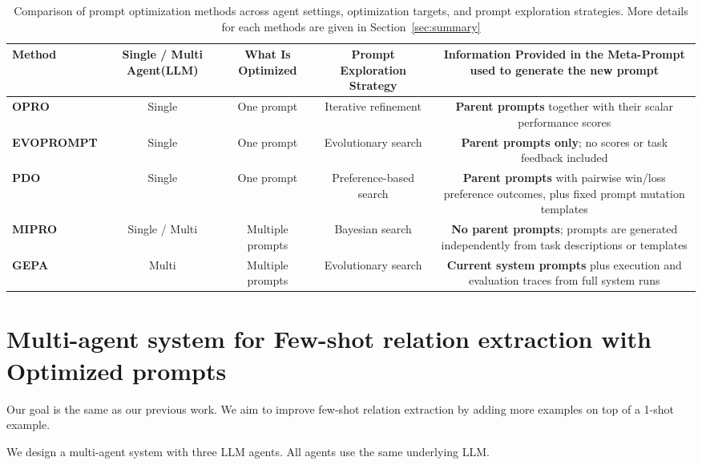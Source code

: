 \documentclass[12pt]{article}
\begin{document}
\pagebreak
\begin{table}[h]
\centering
\small
\begin{tabular}{l c c c c}
\toprule
\textbf{Method} &
\textbf{Single / Multi Agent(LLM)} &
\textbf{What Is Optimized} &
\textbf{Prompt Exploration Strategy} &
\textbf{Information Provided in the Meta-Prompt used to generate the new prompt} \\
\midrule

\textbf{OPRO} \cite{OPRA}&
Single &
One prompt &
Iterative refinement &
\textbf{Parent prompts} together with their scalar performance scores \\

\textbf{EVOPROMPT} \cite{EVOPROMPT} &
Single &
One prompt &
Evolutionary search &
\textbf{Parent prompts only}; no scores or task feedback included \\

\textbf{PDO} \cite{PDO}&
Single &
One prompt &
Preference-based search &
\textbf{Parent prompts} with pairwise win/loss preference outcomes, plus fixed prompt mutation templates \\

\textbf{MIPRO} \cite{MIPRO}&
Single / Multi &
Multiple prompts &
Bayesian search &
\textbf{No parent prompts}; prompts are generated independently from task descriptions or templates \\

\textbf{GEPA} \cite{GEPA}&
Multi &
Multiple prompts &
Evolutionary search &
\textbf{Current system prompts} plus execution and evaluation traces from full system runs \\

\bottomrule
\end{tabular}
\caption{Comparison of prompt optimization methods across agent settings, optimization targets, and prompt exploration strategies. 
More details for each methods are given in Section~\ref{sec:summary}}
\label{tab:prompt_optimization_comparison}
\end{table}

\section{Multi-agent system for Few-shot relation extraction with Optimized prompts}
\label{sec:method}

Our goal is the same as our previous work.  
We aim to improve few-shot relation extraction by adding more examples on top of a 1-shot example.  

We design a multi-agent system with three LLM agents.  
All agents use the same underlying LLM.  
\end{document}
